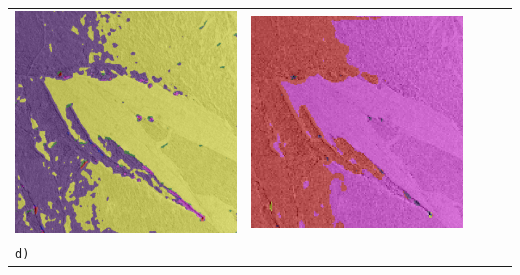 \begin{table}[h!]
\begin{tabularx}{\textwidth}{>{\centering}m{}
			>{\centering}m{}
			>{\centering}m{}
			>{\centering}m{}
			>{\centering\arraybackslash}m{}}
		\includegraphics[width=0.9\linewidth]{images/gen/pooling_layers/p03_03.png_2.png} &
		\includegraphics[width=0.9\linewidth]{images/gen/pooling_layers/p03_03.png_4.png} \\
		\texttt{d)} &

\end{tabularx}
\end{table}
